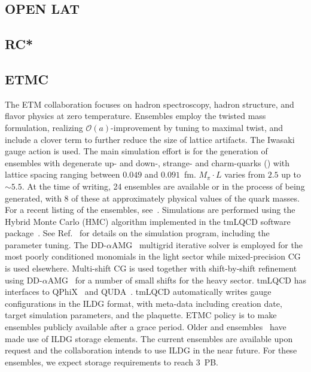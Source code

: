 \documentclass[a4paper,11pt]{article}
\begin{document}
\subsection{OPEN LAT}
\newpage
\subsection{RC*}

\subsection{ETMC}
\begin{linenumbers}[1]
The ETM collaboration focuses on hadron spectroscopy, hadron
structure, and flavor physics at zero temperature. Ensembles employ
the twisted mass formulation, realizing $\mathcal{O}(a)$-improvement
by tuning to maximal twist, and include a clover term to further
reduce the size of lattice artifacts. The Iwasaki gauge action is
used. The main simulation effort is for the generation of ensembles
with degenerate up- and down-, strange- and charm-quarks
() with lattice spacing ranging between $0.049$ and
$0.091$~fm. $M_\pi\cdot L$ varies from $2.5$ up to ${\sim}5.5$. At the
time of writing, 24 ensembles are available or in the process of being
generated, with 8 of these at approximately physical values of the
quark masses. For a recent listing of the ensembles,
see~\cite{ETMCPoster:2024}. Simulations are performed using the Hybrid
Monte Carlo (HMC) algorithm implemented in the tmLQCD software
package~\cite{Jansen:2009xp,Deuzeman:2013xaa,Abdel-Rehim:2013wba}. See
Ref.~\cite{Alexandrou:2018egz} for details on the simulation program,
including the parameter tuning. The
DD-$\alpha$AMG~\cite{Frommer:2013fsa,Alexandrou:2016izb} multigrid
iterative solver is employed for the most poorly conditioned monomials
in the light sector while mixed-precision CG is used
elsewhere. Multi-shift CG is used together with shift-by-shift
refinement using DD-$\alpha$AMG~\cite{Alexandrou:2018wiv} for a number
of small shifts for the heavy sector. tmLQCD has interfaces to
QPhiX~\cite{Joo:2013lwm} and QUDA~\cite{Clark:2009wm,Babich:2011np}.
tmLQCD automatically writes gauge configurations in the ILDG format,
with meta-data including creation date, target simulation parameters,
and the plaquette. ETMC policy is to make ensembles publicly
available after a grace period. Older  and 
ensembles~\cite{Baron:2010bv,EuropeanTwistedMass:2010voq,ETM:2009ztk}
have made use of ILDG storage elements. The current ensembles are
available upon request and the collaboration intends to use ILDG in
the near future. For these ensembles, we expect storage requirements
to reach 3~PB.
\end{linenumbers}
\end{document}
